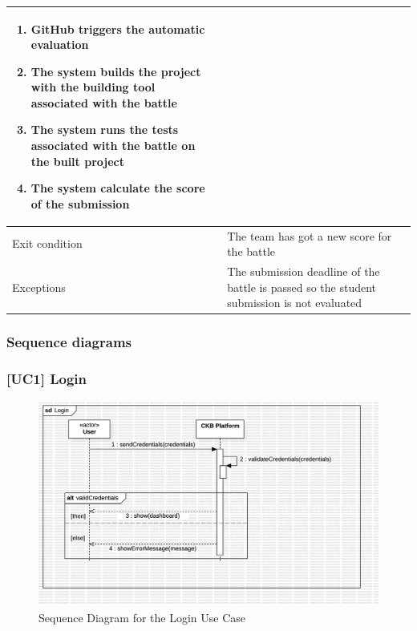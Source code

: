 \begin{enumerate}[label=UC\arabic*:]
\begin{tabular}{|p{3cm}|p{8cm}|}
\begin{enumerate}[label=\arabic*.]
            \item GitHub triggers the automatic evaluation
            \item The system builds the project with the building tool associated with the battle
            \item The system runs the tests associated with the battle on the built project
            \item The system calculate the score of the submission
        \end{enumerate} \\
        \hline
        Exit condition & The team has got a new score for the battle \\
        \hline
        Exceptions & The submission deadline of the battle is passed so the student submission is not evaluated \\
        \hline
    \end{tabular}
\end{enumerate}

\subsubsection{Sequence diagrams}
\subsubsection*{[UC1] Login}
\begin{figure}[H]
    \centering
    \includegraphics[width=\textwidth]{Diagrams/UC1SequenceDiagram.jpg}
    \caption{Sequence Diagram for the Login Use Case}
    \label{fig:sequence-diagram-login}
\end{figure}

